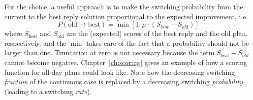 For the choice, a useful approach is to make the switching probability from
the current to the best reply solution proportional to the
expected improvement, i.e.
\[
P(\text{old} \to \text{best}) = \min[ 1, \mu \cdot (S_{best} - S_{old}) ]
\]
where $S_\text{best}$ and $S_\text{old}$ are the (expected) scores of the best reply
and the old plan, respectively, and the $\min$ takes care of the fact that a probability should not be larger than one. %
Truncation at zero is not 
  necessary because the term $S_{best} - S_{old}$ cannot become negative.
Chapter~\ref{ch:scoring} %
gives an example of how a scoring function for all-day plans could
look like.
Note how
the decreasing switching \emph{fraction} of the continuous case is
replaced by a decreasing switching \emph{probability} (leading to a switching \emph{rate}).


